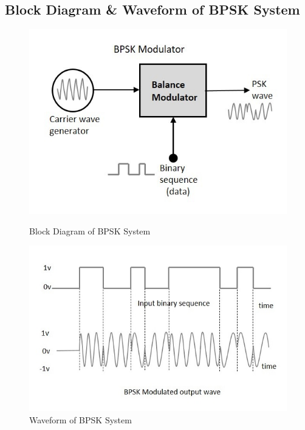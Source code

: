 \documentclass[12pt]{article}
\begin{document}
\subsection*{Block Diagram \& Waveform of BPSK System}
\begin{figure}[H]
    \centering
    \begin{multicols}{2}
        \includegraphics[width=.95\linewidth]{bspk_modulator.jpg}
        \caption{Block Diagram of BPSK System}
        \label{fig:psk_modulator}

        \includegraphics[width=.95\linewidth]{bspk_modulated_output_wave.jpg}
        \caption{Waveform of BPSK System}
        \label{fig:psk_waveform}
    \end{multicols}
\end{figure}
\end{document}
